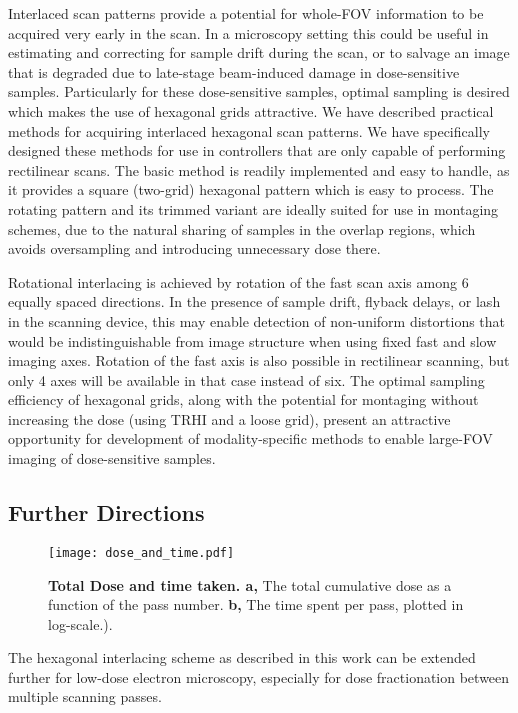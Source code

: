 \documentclass[aip, amsmath, amssymb, nobibnotes, nofootinbib, citeautoscript, reprint, superscriptaddress]{revtex4-2}
\begin{document}
    Interlaced scan patterns provide a potential for whole-FOV information to be acquired very early in the scan.
    In a microscopy setting this could be useful in estimating and correcting for sample drift during the scan, or to salvage an image that is degraded due to late-stage beam-induced damage in dose-sensitive samples.
    Particularly for these dose-sensitive samples, optimal sampling is desired which makes the use of hexagonal grids attractive.
    We have described practical methods for acquiring interlaced hexagonal scan patterns.
    We have specifically designed these methods for use in controllers that are only
    capable of performing rectilinear scans.
    The basic method is readily implemented and easy to handle, as it provides a square (two-grid) hexagonal pattern which is easy to process.
    The rotating pattern and its trimmed variant are ideally suited for use in montaging schemes, due to the natural sharing of samples in the overlap regions, which avoids oversampling and introducing unnecessary dose there.

    Rotational interlacing is achieved by rotation of the fast scan axis among 6 equally spaced directions.
    In the presence of sample drift, flyback delays, or lash in the scanning device, this may enable detection of non-uniform distortions that would be indistinguishable from image structure when using fixed fast and slow imaging axes.
    Rotation of the fast axis is also possible in rectilinear scanning, but only 4 axes will be available in that case instead of six.
    The optimal sampling efficiency of hexagonal grids, along with the potential for montaging without increasing the dose (using TRHI and a loose grid), present an attractive opportunity for development of modality-specific methods to enable large-FOV imaging of dose-sensitive samples.

    \subsection{\label{ssec:wavelets}Further Directions}

    \begin{figure}
        \texttt{[image: dose\_and\_time.pdf]}
        \caption{
        \label{fig:dose} 
            \textbf{Total Dose and time taken. a,} The total cumulative dose as a function of the pass number. \textbf{b,} The time spent per pass, plotted in log-scale.).
        }
    \end{figure}
    The hexagonal interlacing scheme as described in this work can be extended further for low-dose electron microscopy, especially for dose fractionation between multiple scanning passes.
\end{document}

